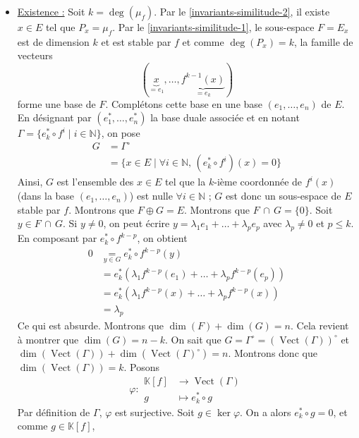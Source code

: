 	\begin{demonstration}
		\begin{itemize}
			\item \underline{Existence :} Soit $k = \deg(\mu_f)$. Par le \cref{invariants-similitude-2}, il existe $x \in E$ tel que $P_x = \mu_f$. Par le \cref{invariants-similitude-1}, le sous-espace $F = E_x$ est de dimension $k$ et est stable par $f$ et comme $\deg(P_x) = k$, la famille de vecteurs
			\[ (\underbrace{x}_{= e_1}, \dots, \underbrace{f^{k-1}(x)}_{= e_k}) \]
			forme une base de $F$. Complétons cette base en une base $(e_1, \dots, e_n)$ de $E$. En désignant par $(e_1^*, \dots, e_n^*)$ la base duale associée et en notant $\Gamma = \{ e_k^* \circ f^i \mid i \in \mathbb{N} \}$, on pose
			\begin{align*}
				G &= \Gamma^\circ \\
				&= \{ x \in E \mid \forall i \in \mathbb{N}, \, (e_k^* \circ f^i)(x) = 0 \}
			\end{align*}
			Ainsi, $G$ est l'ensemble des $x \in E$ tel que la $k$-ième coordonnée de $f^i(x)$ (dans la base $(e_1, \dots, e_n)$)  est nulle $\forall i \in \mathbb{N}$ ; $G$ est donc un sous-espace de $E$ stable par $f$. Montrons que $F \oplus G = E$.
			\newpar
			Montrons que $F \, \cap \, G = \{ 0 \}$. Soit $y \in F \, \cap \, G$. Si $y \neq 0$, on peut écrire $y = \lambda_1 e_1 + \dots + \lambda_p e_p$ avec $\lambda_p \neq 0$ et $p \leq k$. En composant par $e_k^* \circ f^{k-p}$, on obtient
			\begin{align*}
				0 &\underset{y \in G}{=} e_k^* \circ f^{k-p}(y) \\
				&= e_k^* (\lambda_1 f^{k-p}(e_1) + \dots + \lambda_p f^{k-p}(e_p)) \\
				&= e_k^* (\lambda_1 f^{k-p}(x) + \dots + \lambda_p f^{k-p}(x)) \\
				&= \lambda_p
			\end{align*}
			Ce qui est absurde.
			\newpar
			Montrons que $\dim(F) + \dim(G) = n$. Cela revient à montrer que $\dim(G) = n - k$. On sait que $G = \Gamma^\circ = (\operatorname{Vect}(\Gamma))^\circ$ et $\dim(\operatorname{Vect}(\Gamma)) + \dim(\operatorname{Vect}(\Gamma)^\circ) = n$. Montrons donc que $\dim(\operatorname{Vect}(\Gamma)) = k$. Posons
			\[
			\varphi :
			\begin{array}{cl}
				\mathbb{K}[f] &\rightarrow \operatorname{Vect}(\Gamma) \\
				g &\mapsto e_k^* \circ g
			\end{array}
			\]
			Par définition de $\Gamma$, $\varphi$ est surjective. Soit $g \in \ker{\varphi}$. On a alors $e_k^* \circ g = 0$, et comme $g \in \mathbb{K}[f]$,

\end{itemize}
\end{demonstration}
